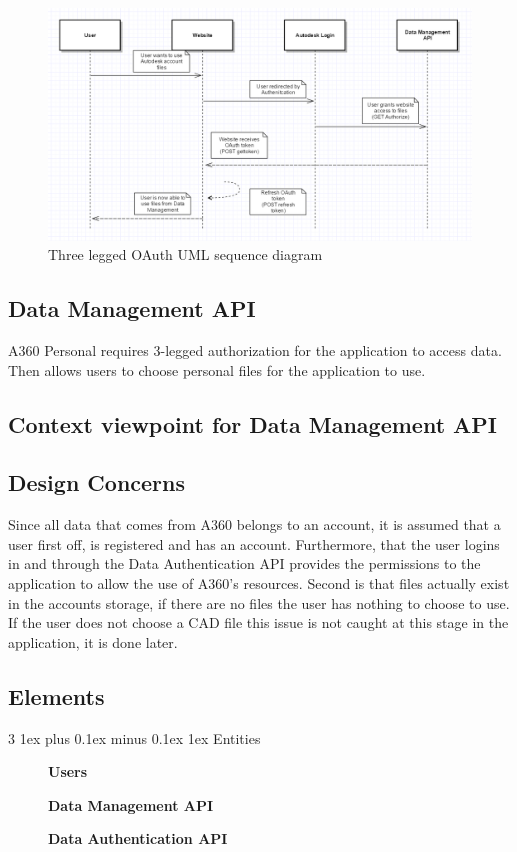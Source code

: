\documentclass[letterpaper, 10pt, draftclsnofoot, compsoc, onecolumn]{IEEEtran}
\makeatletter
\def\subsubsection{\@startsection{subsubsection}%
                                 {3}%
                                 {\z@}%
                                 {1ex plus 0.1ex minus 0.1ex}%
                                 {1ex}%
                                 {\normalfont\normalsize}}%
\makeatother
\begin{document}
\begin{figure}[ht]
	\includegraphics[scale=0.55]{Authentication3legged.png}
	\caption{Three legged OAuth UML sequence diagram}
\end{figure}

\subsection{Data Management API}
\label{A360} 
	A360 Personal requires 3-legged authorization for the application to access data. Then allows users to choose personal files for the application to use.
\subsection{Context viewpoint for Data Management API}
	
\subsection{Design Concerns}
	Since all data that comes from A360 belongs to an account, it is assumed that a user first off, is registered and has an account. Furthermore, that the user logins in and through the Data Authentication API provides the permissions to the application to allow the use of A360's resources. Second is that files actually exist in the accounts storage, if there are no files the user has nothing to choose to use. If the user does not choose a CAD file this issue is not caught at this stage in the application, it is done later.
\subsection{Elements}
\subsubsection{Entities}
\begin{description}
	\item[]\textbf{Users} 
	\item[]\textbf{Data Management API}
	\item[]\textbf{Data Authentication API}
\end{description}
\end{document}
